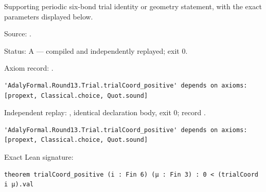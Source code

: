 \begin{theorem}[bp-388]
\label{bp-388}
\leanok
Supporting periodic six-bond trial identity or geometry statement, with the exact parameters displayed below.

\par Source: \texttt{}.
\par Status: A — compiled and independently replayed; exit 0.
\par Axiom record: \texttt{}.
\begin{verbatim}
'AdalyFormal.Round13.Trial.trialCoord_positive' depends on axioms: [propext, Classical.choice, Quot.sound]
\end{verbatim}
\par Independent replay: \texttt{}, identical declaration body, exit 0; record \texttt{}.
\begin{verbatim}
'AdalyFormal.Round13.Trial.trialCoord_positive' depends on axioms: [propext, Classical.choice, Quot.sound]
\end{verbatim}
\par Exact Lean signature:
\begin{verbatim}
theorem trialCoord_positive (i : Fin 6) (μ : Fin 3) : 0 < (trialCoord i μ).val
\end{verbatim}
\end{theorem}

